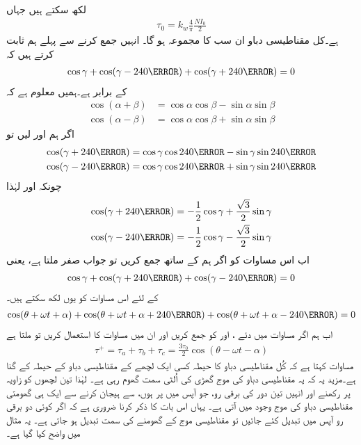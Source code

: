 لکھ سکتے ہیں جہاں
\begin{align}
\tau_0=k_w \frac{4}{\pi}\frac{N I_0}{2}
\end{align}
ہے۔کل مقناطیسی دباو  ان سب کا مجموعہ ہو گا۔ انہیں جمع کرنے سے پہلے ہم ثابت کرتے ہیں کہ
\begin{align*}
\cos \gamma +\cos (\gamma -240\degree)+\cos (\gamma+240\degree)=0
\end{align*}
کے برابر ہے۔ہمیں معلوم ہے کہ 
\begin{align*}
\cos  (\alpha +\beta)&=\cos \alpha \cos \beta-\sin \alpha \sin \beta\\
\cos  (\alpha -\beta)&=\cos \alpha \cos \beta+\sin \alpha \sin \beta
\end{align*}
اگر ہم  اور  لیں تو
\begin{align*}
\cos (\gamma+240\degree)&=\cos \gamma \cos 240\degree-\sin \gamma \sin 240\degree\\
\cos (\gamma-240\degree)&=\cos \gamma \cos 240\degree+\sin \gamma \sin 240\degree
\end{align*}
چونکہ  اور  لہٰذا
\begin{align*}
\cos (\gamma+240\degree)&=-\frac{1}{2}\cos \gamma +\frac{\sqrt{3}}{2}\sin \gamma\\
\cos (\gamma-240\degree)&=-\frac{1}{2}\cos \gamma -\frac{\sqrt{3}}{2}\sin \gamma
\end{align*}
اب اس مساوات کو اگر ہم   کے ساتھ جمع کریں تو جواب صفر ملتا ہے، یعنی
\begin{align*}
\cos \gamma +\cos (\gamma+240\degree)+\cos (\gamma-240\degree)=0
\end{align*}
 کے لئے اس مساوات کو یوں لکھ سکتے ہیں۔
\begin{align}\label{مساوات_تبادلہ_تین_سمتیات_جمع_صفر}
\cos (\theta +\omega t +\alpha) +\cos (\theta +\omega t +\alpha+240\degree)+\cos (\theta+\omega t +\alpha-240\degree)=0
\end{align}
اب ہم  اگر مساوات   میں دئے   ،  اور   کو جمع کریں اور ان میں مساوات   کا استعمال کریں تو ملتا ہے
\begin{align}\label{مساوات_تبادلہ_گھومتا_موج}
\tau^+=\tau_a+\tau_b+\tau_c=\frac{3 \tau_0}{2} \cos (\theta -\omega t -\alpha)
\end{align}
مساوات  کہتا ہے کہ کُل مقناطیسی دباو کا حیطہ کسی ایک لچھے کے مقناطیسی دباو کے حیطہ کے  گنا ہے۔مزید یہ کہ یہ مقناطیسی دباو کی موج گھڑی کی اُلٹی سمت گھوم رہی ہے۔ لہٰذا تین لچھوں کو   زاویہ پر رکھنے اور انہیں تین دور کی برقی رو، جو آپس میں  پر ہوں،  سے  ہیجان کرنے سے ایک ہی گھومتی مقناطیسی دباو کی موج وجود میں آتی ہے۔ یہاں اس بات کا ذکر کرنا ضروری ہے کہ اگر کوئی دو برقی رو آپس میں تبدیل کئے جائیں تو مقناطیسی موج کے گھومنے کی سمت تبدیل ہو جاتی ہے۔  یہ مثال میں واضح کیا گیا ہے۔

